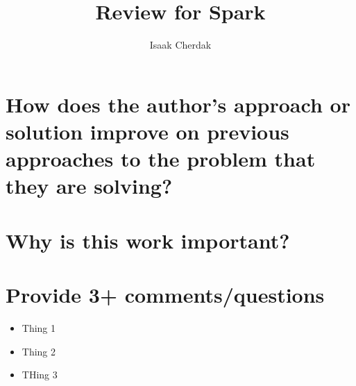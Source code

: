 \documentclass{article}
\title{Review for Spark}
\author{Isaak Cherdak}
\begin{document}
\maketitle

\section{How does the author's approach or solution improve on previous
approaches to the problem that they are solving?}


\section{Why is this work important?}


\section{Provide 3+ comments/questions}

\begin{itemize}
  \item Thing 1
  \item Thing 2
  \item THing 3
\end{itemize}
\end{document}
